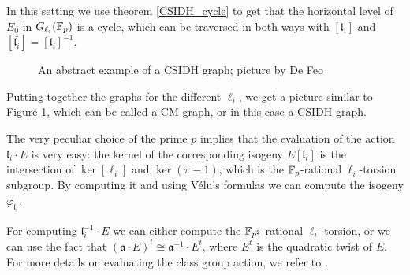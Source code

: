 In this setting we use theorem \ref{CSIDH_cycle} to get that the horizontal level of $E_0$ in $G_{\ell_i}(\mathbb{F}_p)$ is a cycle, which can be traversed in both ways with $[\mathfrak{l}_i]$ and $[\bar{\mathfrak{l}_i}]=[\mathfrak{l}_i]^{-1}$.

\begin{figure}
    \centering
    \caption{An abstract example of a CSIDH graph; picture by De Feo}
    \label{picture_CSIDH}
\end{figure}

Putting together the graphs for the different $\ell_i$, we get a picture similar to Figure \ref{picture_CSIDH}, which can be called a CM graph, or in this case a CSIDH graph.

The very peculiar choice of the prime $p$ implies that the evaluation of the action $\mathfrak{l}_i\cdot E$ is very easy: the kernel of the corresponding isogeny $E[\mathfrak{l}_i]$ is the intersection of $\ker[\ell_i]$ and $\ker(\pi-1)$, which is the $\mathbb{F}_p$-rational $\ell_i$-torsion subgroup. By computing it and using Vélu's formulas we can compute the isogeny $\varphi_{\mathfrak{l}_i}$.

For computing $\mathfrak{l}_i^{-1}\cdot E$ we can either compute the $\mathbb{F}_{p^2}$-rational $\ell_i$-torsion, or we can use the fact that $(\mathfrak{a}\cdot E)^t\cong\mathfrak{a}^{-1}\cdot E^t$, where $E^t$ is the quadratic twist of $E$. For more details on evaluating the class group action, we refer to \cite[section 8]{CSIDH}.

